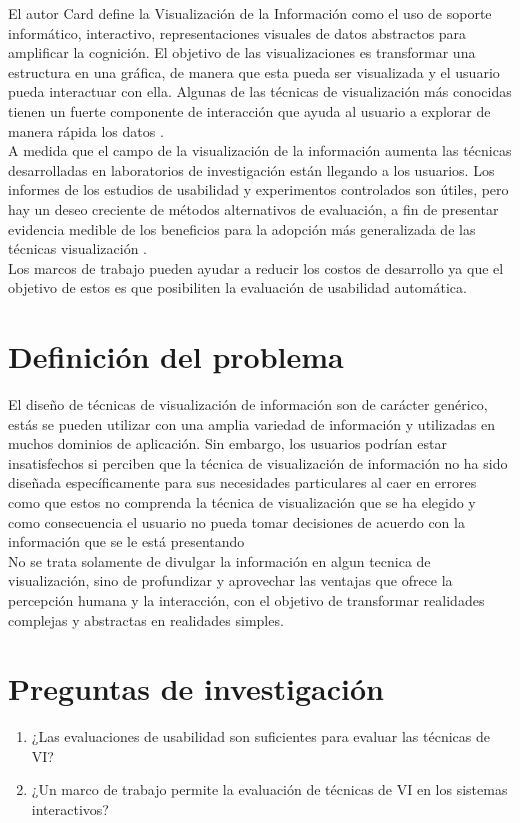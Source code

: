 El autor Card define la Visualización de la Información como el uso de soporte informático, interactivo, representaciones visuales de datos abstractos para amplificar la cognición\cite{  card1999readings}. El objetivo de las visualizaciones es transformar una estructura en una gráfica, de manera que esta pueda ser visualizada y el usuario pueda interactuar con ella. Algunas de las técnicas de visualización más conocidas tienen un fuerte componente de interacción que ayuda al usuario a explorar de manera rápida los datos \cite{olmeda2014visualizacion}.\\
A medida que el campo de la visualización de la información aumenta las técnicas desarrolladas en laboratorios de investigación están llegando a los usuarios. Los informes de los estudios de usabilidad y experimentos controlados son útiles, pero hay un deseo creciente de métodos alternativos de evaluación, a fin de presentar evidencia medible de los beneficios para la adopción más generalizada de las técnicas visualización \cite{arjona}.\\
Los marcos de trabajo  pueden ayudar a reducir los costos de desarrollo ya que el objetivo de estos es que posibiliten la evaluación de usabilidad automática.

\section{Definición del problema}
El diseño de técnicas de visualización de información son de carácter genérico, estás se pueden utilizar con una amplia variedad de información y utilizadas en muchos dominios de aplicación. Sin embargo, los usuarios podrían estar insatisfechos si perciben que la técnica de visualización de información no ha sido diseñada específicamente para sus necesidades particulares al caer en errores como que estos no comprenda la técnica de visualización  que se ha elegido  y como consecuencia el usuario  no pueda tomar decisiones de acuerdo con la información que se le está presentando\cite{shneiderman}\\
No se trata solamente de divulgar la información en algun tecnica de visualización, sino de profundizar y aprovechar las ventajas que ofrece la percepción humana y la interacción, con el objetivo de transformar realidades complejas y abstractas en realidades simples.

\section{Preguntas de investigación}
\begin{enumerate}
\item ¿Las evaluaciones de usabilidad son suficientes para evaluar las técnicas de VI?
\item ¿Un marco de trabajo permite la evaluación de técnicas de  VI en los sistemas interactivos?
\end{enumerate}

